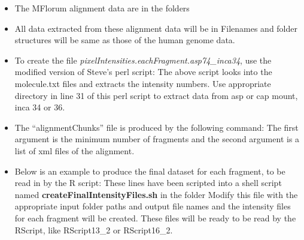 \documentclass[11pt]{article}
\begin{document}
\begin{itemize}
\item
The MFlorum alignment data are in the folders
\item
All data extracted from these alignment data will be in 
Filenames and folder structures will be same as those of the human genome data. 
\item
To create the file {\it{pixelIntensities.eachFragment.asp74\_inca34}}, use the modified version of Steve's perl script: 
The above script looks into the molecule.txt files and extracts the intensity numbers.
Use appropriate directory in line 31 of this perl script to extract data from asp or cap mount, inca 34 or 36.
\item
The ``alignmentChunks'' file is produced by the following command:
The first argument is the minimum number of fragments and the second argument is a list of xml files of the alignment. 
\item
Below is an example to produce the final dataset for each fragment, to be read in by the R script:
These lines have been scripted into a shell script named {\bf{createFinalIntensityFiles.sh}} in the folder 
Modify this file with the appropriate input folder paths and output file names and the intensity files for each fragment will be created. These files will be ready to be read by the RScript, like RScript13\_2 or RScript16\_2. 
\end{itemize}
\end{document}

